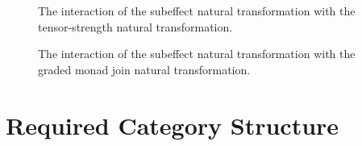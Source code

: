 \begin{figure}[H]
\centering
\begin{minipage}{0.45\linewidth}
    \begin{framed}
    \end{framed}
    \caption{The interaction of the subeffect natural transformation with the tensor-strength natural transformation.}
    \label{SubeffectTensorStrength}
\end{minipage}  
\quad
\begin{minipage}{0.45\linewidth}
    \begin{framed}
    \end{framed}

\caption{The interaction of the subeffect natural transformation with the graded monad join natural transformation.}
\label{SubeffectBind}
\end{minipage}  
\end{figure}


\section{Required Category Structure}\label{PECRequirements}

